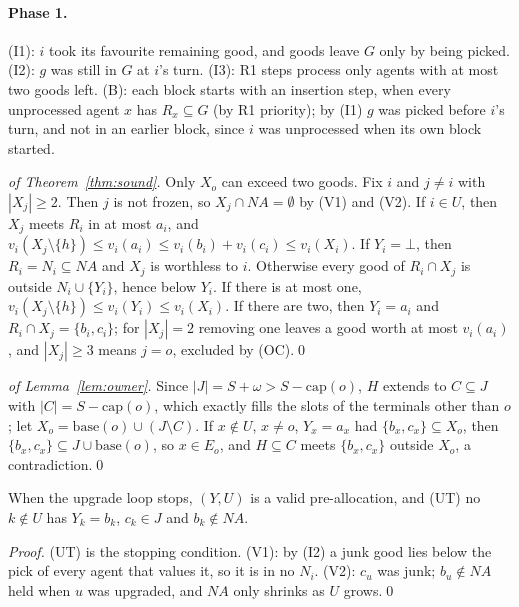 \documentclass[runningheads,11pt]{llncs}
\newcommand{\NA}{\mathit{NA}}
\newcommand{\capa}{\mathrm{cap}}
\newcommand{\base}{\mathrm{base}}
\newcommand{\none}{\bot}
\begin{document}
\paragraph{Phase 1.} (I1): $i$ took its favourite remaining good, and goods leave $G$ only by being picked. (I2): $g$ was still in $G$ at $i$'s turn. (I3): R1 steps process only agents with at most two goods left. (B): each block starts with an insertion step, when every unprocessed agent $x$ has $R_x\subseteq G$ (by R1 priority); by (I1) $g$ was picked before $i$'s turn, and not in an earlier block, since $i$ was unprocessed when its own block started.

\begin{proof}[of Theorem~\ref{thm:sound}]
Only $X_o$ can exceed two goods. Fix $i$ and $j\ne i$ with $|X_j|\ge2$. Then $j$ is not frozen, so $X_j\cap\NA=\emptyset$ by (V1) and (V2). If $i\in U$, then $X_j$ meets $R_i$ in at most $a_i$, and $v_i(X_j\setminus\{h\})\le v_i(a_i)\le v_i(b_i)+v_i(c_i)\le v_i(X_i)$. If $Y_i=\none$, then $R_i=N_i\subseteq\NA$ and $X_j$ is worthless to $i$. Otherwise every good of $R_i\cap X_j$ is outside $N_i\cup\{Y_i\}$, hence below $Y_i$. If there is at most one, $v_i(X_j\setminus\{h\})\le v_i(Y_i)\le v_i(X_i)$. If there are two, then $Y_i=a_i$ and $R_i\cap X_j=\{b_i,c_i\}$; for $|X_j|=2$ removing one leaves a good worth at most $v_i(a_i)$, and $|X_j|\ge3$ means $j=o$, excluded by (OC).\qed
\end{proof}

\begin{proof}[of Lemma~\ref{lem:owner}]
Since $|J|=S+\omega>S-\capa(o)$, $H$ extends to $C\subseteq J$ with $|C|=S-\capa(o)$, which exactly fills the slots of the terminals other than $o$; let $X_o=\base(o)\cup(J\setminus C)$. If $x\notin U$, $x\ne o$, $Y_x=a_x$ had $\{b_x,c_x\}\subseteq X_o$, then $\{b_x,c_x\}\subseteq J\cup\base(o)$, so $x\in E_o$, and $H\subseteq C$ meets $\{b_x,c_x\}$ outside $X_o$, a contradiction.\qed
\end{proof}

\begin{lemma}[upgrades]\label{lem:upgrades}
When the upgrade loop stops, $(Y,U)$ is a valid pre-allocation, and (UT) no $k\notin U$ has $Y_k=b_k$, $c_k\in J$ and $b_k\notin\NA$.
\end{lemma}

\begin{proof}
(UT) is the stopping condition. (V1): by (I2) a junk good lies below the pick of every agent that values it, so it is in no $N_i$. (V2): $c_u$ was junk; $b_u\notin\NA$ held when $u$ was upgraded, and $\NA$ only shrinks as $U$ grows.\qed
\end{proof}
\end{document}

